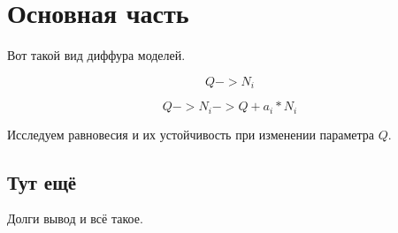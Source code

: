\section{Основная часть}
    Вот такой вид диффура моделей.

    \begin{equation} \label{unlocked}
        Q -> N_i
    \end{equation}


    \begin{equation} \label{locked}
        Q -> N_i -> Q + a_i * N_i
    \end{equation}

    Исследуем равновесия и их устойчивость при изменении параметра \(Q\).

    \subsection{Тут ещё}
        Долги вывод и всё такое.

    \begin{figure}[H]
        \centering
        \caption{}  \label{pic_label}
    \end{figure}

